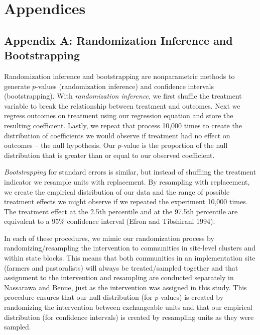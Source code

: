 \documentclass[11pt]{article}
\begin{document}
\hypertarget{appendices}{%
\section{Appendices}\label{appendices}}

\hypertarget{appendix-a-randomization-inference-and-bootstrapping}{%
\subsection{Appendix A: Randomization Inference and
Bootstrapping}\label{appendix-a-randomization-inference-and-bootstrapping}}

Randomization inference and bootstrapping are nonparametric methods to
generate \(p\)-values (randomization inference) and confidence intervals
(bootstrapping). With \emph{randomization inference}, we first shuffle
the treatment variable to break the relationship between treatment and
outcomes. Next we regress outcomes on treatment using our regression
equation and store the resulting coefficient. Lastly, we repeat that
process 10,000 times to create the distribution of coefficients we would
observe if treatment had no effect on outcomes -- the null hypothesis.
Our \(p\)-value is the proportion of the null distribution that is
greater than or equal to our observed coefficient.

\emph{Bootstrapping} for standard errors is similar, but instead of
shuffling the treatment indicator we resample units with replacement. By
resampling with replacement, we create the empirical distribution of our
data and the range of possible treatment effects we might observe if we
repeated the experiment 10,000 times. The treatment effect at the 2.5th
percentile and at the 97.5th percentile are equivalent to a 95\%
confidence interval (Efron and Tibshirani 1994).

In each of these procedures, we mimic our randomization process by
randomizing/resampling the intervention to communities in site-level
clusters and within state blocks. This means that both communities in an
implementation site (farmers and pastoralists) will always be
treated/sampled together and that assignment to the intervention and
resampling are conducted separately in Nassarawa and Benue, just as the
intervention was assigned in this study. This procedure ensures that our
null distribution (for \(p\)-values) is created by randomizing the
intervention between exchangeable units and that our empirical
distribution (for confidence intervals) is created by resampling units
as they were sampled.
\end{document}
